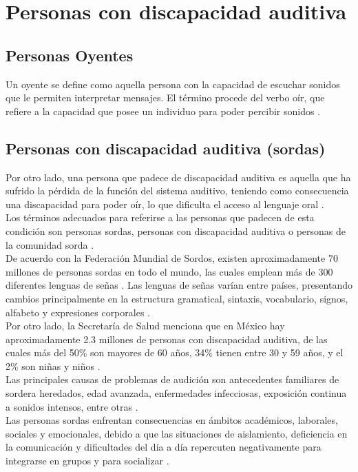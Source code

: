 \section{Personas con discapacidad auditiva}
\subsection{Personas Oyentes}
Un oyente se define como aquella persona con la capacidad de escuchar sonidos que le permiten interpretar mensajes. El término procede del verbo oír, que refiere a la capacidad que posee un individuo para poder percibir sonidos \cite{ref26}.

\subsection{Personas con discapacidad auditiva (sordas)}
Por otro lado, una persona que padece de discapacidad auditiva es aquella que ha sufrido la pérdida de la función del sistema auditivo, teniendo como consecuencia una discapacidad para poder oír, lo que dificulta el acceso al lenguaje oral \cite{ref27}.\\ 

Los términos adecuados para referirse a las personas que padecen de esta condición son personas sordas, personas con discapacidad auditiva o personas de la comunidad sorda \cite{refsordos}. \\

De acuerdo con la Federación Mundial de Sordos, existen aproximadamente 70 millones de personas sordas en todo el mundo, las cuales emplean más de 300 diferentes lenguas de señas \cite{ref28}. Las lenguas de señas varían entre países, presentando cambios principalmente en la estructura gramatical, sintaxis, vocabulario, signos, alfabeto y expresiones corporales \cite{ref26}.\\

Por otro lado, la Secretaría de Salud menciona que en México hay aproximadamente 2.3 millones de personas con discapacidad auditiva, de las cuales más del 50\% son mayores de 60 años, 34\% tienen entre 30 y 59 años, y el 2\% son niñas y niños \cite{ref3}.\\

Las principales causas de problemas de audición son antecedentes familiares de sordera heredados, edad avanzada, enfermedades infecciosas, exposición continua a sonidos intensos, entre otras \cite{ref3}.\\

Las personas sordas enfrentan consecuencias en ámbitos académicos, laborales, sociales y emocionales, debido a que las situaciones de aislamiento, deficiencia en la comunicación y dificultades del día a día repercuten negativamente para integrarse en grupos y para socializar \cite{ref29}. \\

